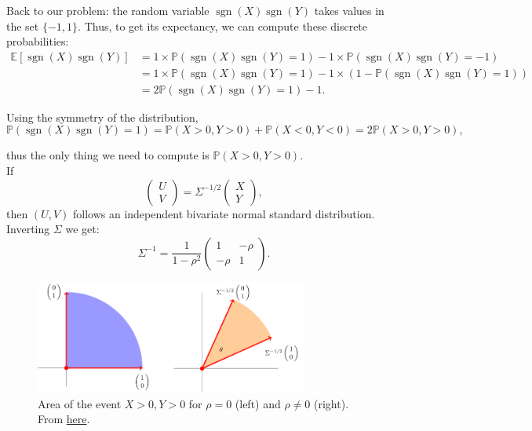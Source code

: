 Back to our problem: the random variable $\operatorname{sgn}(X)\operatorname{sgn}(Y)$ takes values in the set $\{-1,1\}$. Thus, to get its expectancy, we can compute these discrete probabilities:
\begin{align*}
    \mathbb{E}[\operatorname{sgn}(X)\operatorname{sgn}(Y)] &= 1\times \mathbb{P}(\operatorname{sgn}(X)\operatorname{sgn}(Y)=1) -1\times \mathbb{P}(\operatorname{sgn}(X)\operatorname{sgn}(Y)=-1)\\
    &= 1\times \mathbb{P}(\operatorname{sgn}(X)\operatorname{sgn}(Y)=1) -1\times (1-\mathbb{P}(\operatorname{sgn}(X)\operatorname{sgn}(Y)=1))\\
    &= 2\mathbb{P}(\operatorname{sgn}(X)\operatorname{sgn}(Y)=1) -1.
\end{align*}

Using the symmetry of the distribution, $$\mathbb{P}(\operatorname{sgn}(X)\operatorname{sgn}(Y)=1) = \mathbb{P}(X>0,Y>0) + \mathbb{P}(X<0,Y<0) = 2\mathbb{P}(X>0,Y>0),$$

thus the only thing we need to compute is $\mathbb{P}(X>0,Y>0)$.\\

If $$\begin{pmatrix}U\\V\end{pmatrix} = \Sigma^{-1/2}\begin{pmatrix}X\\Y\end{pmatrix},$$
then $(U,V)$ follows an independent bivariate normal standard distribution. Inverting $\Sigma$ we get:
$$\Sigma^{-1} = \frac1{1-\rho^2}\begin{pmatrix}
1 & -\rho\\ -\rho & 1
\end{pmatrix}.$$

\begin{figure}[H]
    \centering
    \includegraphics[width=0.8\textwidth]{img/corr_biv_normal.png}
    \caption{Area of the event $X>0,Y>0$ for $\rho = 0$ (left) and $\rho \ne 0$ (right). From \href{https://math.stackexchange.com/questions/1687795/correlated-joint-normal-distribution-calculating-a-probability}{here}.}
\end{figure}

